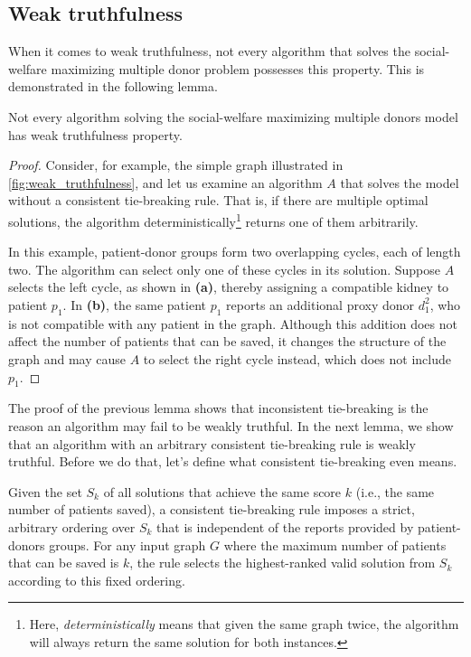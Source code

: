 \subsection{Weak truthfulness}
When it comes to weak truthfulness, not every algorithm that solves the social-welfare maximizing multiple donor problem possesses this property. This is demonstrated in the following lemma.

\begin{lemma}
\label{lemma:weak_truthfulness_false}
    Not every algorithm solving the social-welfare maximizing multiple donors model has weak truthfulness property.
    \begin{proof}
        Consider, for example, the simple graph illustrated in \autoref{fig:weak_truthfulness}, and let us examine an algorithm $A$ that solves the model without a consistent tie-breaking rule. That is, if there are multiple optimal solutions, the algorithm deterministically\footnote{Here, \textit{deterministically} means that given the same graph twice, the algorithm will always return the same solution for both instances.} returns one of them arbitrarily.
    
        In this example, patient-donor groups form two overlapping cycles, each of length two. The algorithm can select only one of these cycles in its solution. Suppose $A$ selects the left cycle, as shown in \textbf{(a)}, thereby assigning a compatible kidney to patient $p_1$. In \textbf{(b)}, the same patient $p_1$ reports an additional proxy donor $d_1^2$, who is not compatible with any patient in the graph. Although this addition does not affect the number of patients that can be saved, it changes the structure of the graph and may cause $A$ to select the right cycle instead, which does not include $p_1$.
    \end{proof}
\end{lemma}

The proof of the previous lemma shows that inconsistent tie-breaking is the reason an algorithm may fail to be weakly truthful. In the next lemma, we show that an algorithm with an arbitrary consistent tie-breaking rule is weakly truthful. Before  we do that, let's define what consistent tie-breaking even means.

\begin{definition}
\label{consistent_tie_breaking_rule}
    Given the set $S_k$ of all solutions that achieve the same score $k$ (i.e., the same number of patients saved), a consistent tie-breaking rule imposes a strict, arbitrary ordering over $S_k$ that is independent of the reports provided by patient-donors groups. For any input graph $G$ where the maximum number of patients that can be saved is $k$, the rule selects the highest-ranked valid solution from $S_k$ according to this fixed ordering.
\end{definition}

